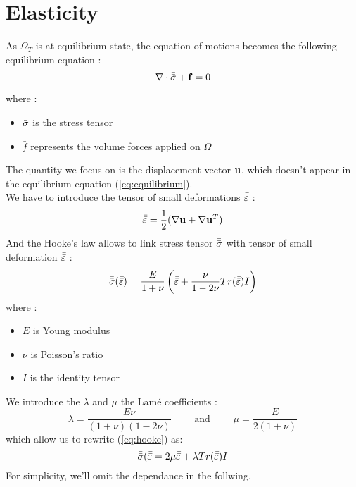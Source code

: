 \section{Elasticity}

As $\Omega_T$ is at equilibrium state, the equation of motions becomes the
following equilibrium equation :
\begin{equation}
  \label{eq:equilibrium}
  \nabla\cdot\bar{\bar{\sigma}} + \mathbf{f} = 0
\end{equation}

where :
\begin{itemize}
  \item $\bar{\bar{\sigma}}$ is the stress tensor
  \item $\bar{f}$ represents the volume forces applied on $\Omega$
\end{itemize}

The quantity we focus on is the displacement vector $\mathbf{u}$, which doesn't appear
in the equilibrium equation (\ref{eq:equilibrium}). \\
We have to introduce the tensor of small deformations $\bar{\bar{\varepsilon}}$ :
\begin{equation}
\label{eq:small-deformation}
\bar{\bar{\varepsilon}} = \frac{1}{2}(\nabla \mathbf{u} + \nabla \mathbf{u}^T)
\end{equation}
And the Hooke's law allows to link stress tensor $\bar{\bar{\sigma}}$ with tensor of
small deformation $\bar{\bar{\varepsilon}}$ :
\begin{equation}
  \label{eq:hooke}
  \bar{\bar{\sigma}}(\bar{\bar{\varepsilon}}) = \frac{E}{1+\nu} \left(\bar{\bar{\varepsilon}}
  + \frac{\nu}{1-2\nu} Tr(\bar{\bar{\varepsilon}}) I \right)
\end{equation}
where :
\begin{itemize}
 \item $E$ is Young modulus
 \item $\nu$ is Poisson's ratio
 \item $I$ is the identity tensor
\end{itemize}
We introduce the $\lambda$ and $\mu$ the Lamé coefficients :
\begin{equation*}
  \lambda=\frac{E\nu}{(1+\nu)(1-2\nu)}
  \quad\quad\text{ and }\quad\quad
  \mu=\frac{E}{2(1+\nu)}
\end{equation*}
which allow us to rewrite (\ref{eq:hooke}) as:
\begin{equation*}
  \bar{\bar{\sigma}}(\bar{\bar{\varepsilon}}
  = 2\mu\bar{\bar{\varepsilon}} + \lambda Tr(\bar{\bar{\varepsilon}})I
\end{equation*}
For simplicity, we'll omit the dependance in the follwing.\\

